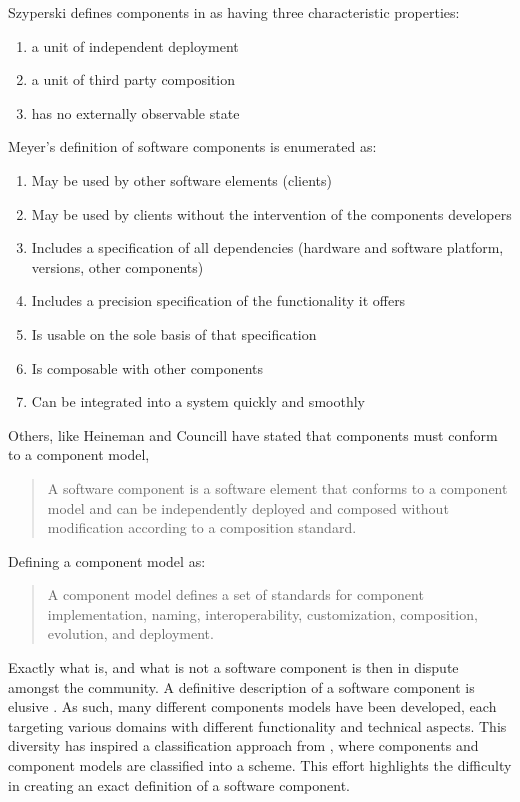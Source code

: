 Szyperski defines components in \cite{Szyperski2002} as having three characteristic properties:
\begin{enumerate}
  \item a unit of independent deployment
  \item a unit of third party composition
  \item has no externally observable state
\end{enumerate}

Meyer's definition of software components is enumerated as:
\begin{enumerate}
  \item May be used by other software elements (clients)
  \item May be used by clients without the intervention of the components
  developers
  \item Includes a specification of all dependencies (hardware and software
  platform, versions, other components)
  \item Includes a precision specification of the functionality it offers
  \item Is usable on the sole basis of that specification
  \item Is composable with other components
  \item Can be integrated into a system quickly and smoothly
\end{enumerate}

Others, like Heineman and Councill \cite{heineman2001component} have stated that components must conform to a component model, 
\begin{quotation}
A software component is a software element that conforms to a component model and can be independently deployed and composed without modification according to a composition standard.
\end{quotation}

Defining a component model as:
\begin{quotation}
A component model defines a set of standards for component implementation, naming, interoperability, customization, composition, evolution, and deployment.
\end{quotation}

Exactly what is, and what is not a software component is then in dispute amongst the community.
A definitive description of a software component is elusive \cite{vasa2007patterns}.
As such, many different components models have been developed, each targeting various domains with different functionality and technical aspects.
This diversity has inspired a classification approach from \cite{Crnkovic2011}, where components and component models are classified into a scheme.
This effort highlights the difficulty in creating an exact definition of a software component. 


